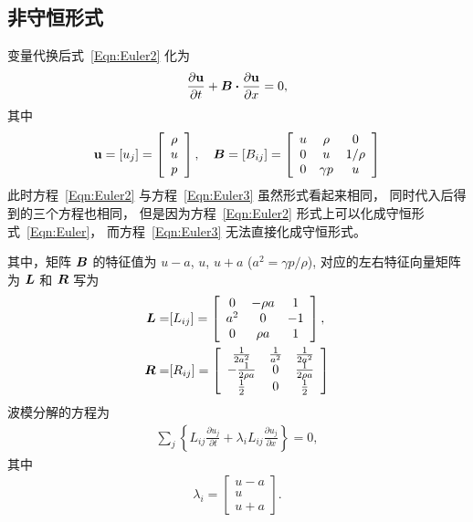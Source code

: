 \documentclass[10.5pt
]{article}
\begin{document}
\subsection{非守恒形式}
变量代换后式~\eqref{Eqn:Euler2} 化为
\begin{align}
\pdv{\vb u}{t} + \vb*B \vdot \pdv{\vb u}{x} = 0,
\label{Eqn:Euler3}
\end{align}
其中
\begin{align}
\vb u = [u_j] = \left[\begin{array}{c}\rho\\ u\\ p\end{array}\right], \quad \vb*B = [B_{ij}] = \left[\begin{array}{ccc}u & \rho & 0\\
0 & u & 1/\rho\\ 0 & \gamma p & u\end{array}\right]
\label{eq:8}
\end{align}
此时方程~\eqref{Eqn:Euler2} 与方程~\eqref{Eqn:Euler3} 虽然形式看起来相同，
同时代入后得到的三个方程也相同，
但是因为方程~\eqref{Eqn:Euler2} 形式上可以化成守恒形式~\eqref{Eqn:Euler}，
而方程~\eqref{Eqn:Euler3} 无法直接化成守恒形式。

其中，矩阵 $\vb*B$ 的特征值为 $u-a$, $u$, $u+a$ ($a^2 = \gamma p/\rho$), 
对应的左右特征向量矩阵为 $\vb*L$ 和 $\vb*R$ 写为
\begin{align}
\vb*L =& [L_{ij}] = \left[\begin{array}{ccc}0 & -\rho a & 1\\ a^2 & 0 & -1\\ 0 & \rho a & 1\end{array}\right],
\\
\vb*R =& [R_{ij}] = \left[\begin{array}{ccc}\frac{1}{2a^2} & \frac{1}{a^2} & \frac{1}{2a^2}\\
-\frac{1}{2\rho a} & 0 & \frac{1}{2\rho a}\\ \frac{1}{2} & 0 & \frac{1}{2}\end{array}\right]
\end{align}
波模分解的方程为
\begin{align}
\sum_j \left\{L_{ij} \frac{\partial u_j}{\partial t} + \lambda_i L_{ij} \frac{\partial u_j}{\partial
x}\right\} = 0,
\end{align}
其中
\begin{align}
\lambda_i =
\left[\begin{array}{c}u-a \\ u\\ u+a\end{array}\right].
\end{align}
\end{document}
